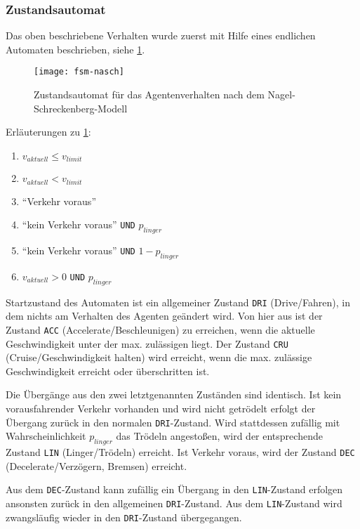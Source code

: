 \subsubsection{Zustandsautomat}

Das oben beschriebene Verhalten wurde zuerst mit Hilfe eines endlichen Automaten beschrieben, siehe \cref{figure:fsm-nasch}.

\begin{figure}[hptb]
 \centering
 \texttt{[image: fsm-nasch]}
 \caption[Zustandsautomat für das Agentenverhalten]
 		{Zustandsautomat für das Agentenverhalten nach dem Nagel-Schreckenberg-Modell}
 \label{figure:fsm-nasch}
\end{figure}

\noindent
Erläuterungen zu \cref{figure:fsm-nasch}:
\begin{enumerate}
\itemsep0em
	\item  $ v_{aktuell}  \leq  v_{limit} $
	\item  $ v_{aktuell}  <  v_{limit} $
	\item  \enquote{Verkehr voraus}
	\item  \enquote{kein Verkehr voraus} \texttt{UND} $ p_{linger} $
	\item  \enquote{kein Verkehr voraus} \texttt{UND} $ 1 - p_{linger} $
	\item  $ v_{aktuell}  > 0 $ \texttt{UND} $ p_{linger} $
\end{enumerate}

Startzustand des Automaten ist ein allgemeiner Zustand \texttt{DRI} (Drive/Fahren), in dem nichts am Verhalten des Agenten geändert wird.
Von hier aus ist der Zustand \texttt{ACC} (Accelerate/Beschleunigen) zu erreichen, wenn die aktuelle Geschwindigkeit unter der max. zulässigen liegt. 
Der Zustand \texttt{CRU} (Cruise/Geschwindigkeit halten) wird erreicht, wenn die max. zulässige Geschwindigkeit erreicht oder überschritten ist.

Die Übergänge aus den zwei letztgenannten Zuständen sind identisch. 
Ist kein vorausfahrender Verkehr vorhanden und wird nicht getrödelt erfolgt der Übergang zurück in den normalen \texttt{DRI}-Zustand.
Wird stattdessen zufällig mit Wahrscheinlichkeit $ p_{linger} $ das Trödeln angestoßen, wird der entsprechende Zustand \texttt{LIN} (Linger/Trödeln) erreicht.
Ist Verkehr voraus, wird der Zustand \texttt{DEC} (Decelerate/Verzögern, Bremsen) erreicht.

Aus dem \texttt{DEC}-Zustand kann zufällig ein Übergang in den \texttt{LIN}-Zustand erfolgen ansonsten zurück in den allgemeinen \texttt{DRI}-Zustand.
Aus dem \texttt{LIN}-Zustand wird zwangsläufig wieder in den \texttt{DRI}-Zustand übergegangen.

